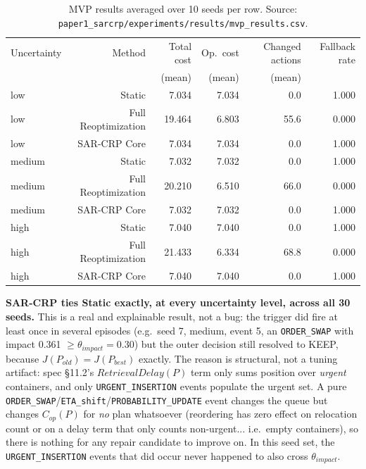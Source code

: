 \documentclass[11pt]{article}
\begin{document}
\begin{table}[h]
\centering
\small
\begin{tabular}{lrrrrr}
\hline
Uncertainty & Method & Total cost & Op.\ cost & Changed actions & Fallback rate \\
            &        & (mean)     & (mean)    & (mean)           &               \\
\hline
low    & Static              & 7.034  & 7.034 & 0.0  & 1.000 \\
low    & Full Reoptimization & 19.464 & 6.803 & 55.6 & 0.000 \\
low    & SAR-CRP Core        & 7.034  & 7.034 & 0.0  & 1.000 \\
\hline
medium & Static              & 7.032  & 7.032 & 0.0  & 1.000 \\
medium & Full Reoptimization & 20.210 & 6.510 & 66.0 & 0.000 \\
medium & SAR-CRP Core        & 7.032  & 7.032 & 0.0  & 1.000 \\
\hline
high   & Static              & 7.040  & 7.040 & 0.0  & 1.000 \\
high   & Full Reoptimization & 21.433 & 6.334 & 68.8 & 0.000 \\
high   & SAR-CRP Core        & 7.040  & 7.040 & 0.0  & 1.000 \\
\hline
\end{tabular}
\caption{MVP results averaged over 10 seeds per row. Source: \texttt{paper1\_sarcrp/experiments/results/mvp\_results.csv}.}
\end{table}

\textbf{SAR-CRP ties Static exactly, at every uncertainty level, across
all 30 seeds.} This is a real and explainable result, not a bug: the
trigger did fire at least once in several episodes (e.g.\ seed 7,
medium, event 5, an \texttt{ORDER\_SWAP} with impact 0.361 $\ge
\theta_{impact}=0.30$) but the outer decision still resolved to KEEP,
because $J(P_{old})=J(P_{best})$ exactly. The reason is structural, not a
tuning artifact: spec \S11.2's $\mathit{RetrievalDelay}(P)$ term only
sums position over \emph{urgent} containers, and only
\texttt{URGENT\_INSERTION} events populate the urgent set. A pure
\texttt{ORDER\_SWAP}/\texttt{ETA\_shift}/\texttt{PROBABILITY\_UPDATE} event
changes the queue but changes $C_{op}(P)$ for \emph{no} plan whatsoever
(reordering has zero effect on relocation count or on a delay term that
only counts non-urgent... i.e.\ empty containers), so there is nothing for
any repair candidate to improve on. In this seed set, the
\texttt{URGENT\_INSERTION} events that did occur never happened to also
cross $\theta_{impact}$.
\end{document}
